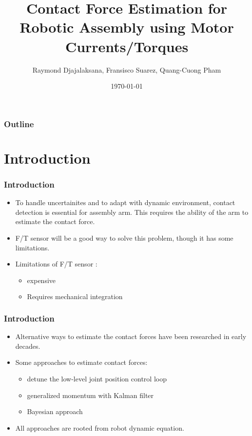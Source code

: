 \documentclass[12pt,english]{beamer}
\title{Contact Force Estimation for Robotic Assembly using Motor Currents/Torques}
\author{Raymond Djajalaksana, Fransisco Suarez, Quang-Cuong Pham}
\date{\today}
\begin{document}
  \frame{\titlepage}
  
  \begin{frame}
    \frametitle{Outline}
    \tableofcontents
  \end{frame}
    
  \section{Introduction}  
  \begin{frame}
    \frametitle{Introduction}
    \begin{itemize}
      \item To handle uncertainites and to adapt with dynamic environment, contact detection is essential for assembly arm. This requires the ability of the arm to estimate the contact force.
      \item F/T sensor will be a good way to solve this problem, though it has some limitations.
      \item Limitations of F/T sensor :
      \begin{itemize}
        \item expensive
        \item Requires mechanical integration
      \end{itemize}
    \end{itemize}
  \end{frame}
  
  \begin{frame}
    \frametitle{Introduction}
    \begin{itemize}
      \item Alternative ways to estimate the contact forces have been researched in early decades.
      \item Some approaches to estimate contact forces:
      \begin{itemize}
        \item detune the low-level joint position control loop
        \item generalized momentum with Kalman filter
        \item Bayesian approach
      \end{itemize}
      \item All approaches are rooted from robot dynamic equation.
    \end{itemize}
  \end{frame}
  
\end{document}
